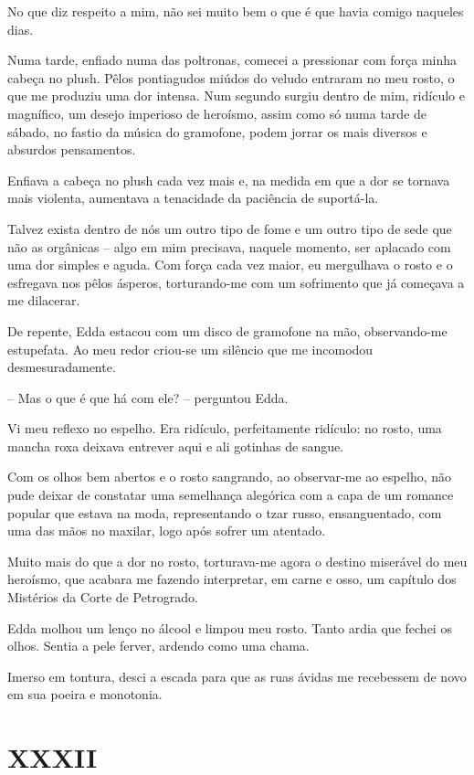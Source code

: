 No que diz respeito a mim, não sei muito bem o que é que havia comigo naqueles dias.

Numa tarde, enfiado numa das poltronas, comecei a pressionar com força minha cabeça no plush. Pêlos pontiagudos miúdos do veludo entraram no meu rosto, o que me produziu uma dor intensa. Num segundo surgiu dentro de mim, ridículo e magnífico, um desejo imperioso de heroísmo, assim como só numa tarde de sábado, no fastio da música do gramofone, podem jorrar os mais diversos e absurdos pensamentos.

Enfiava a cabeça no plush cada vez mais e, na medida em que a dor se tornava mais violenta, aumentava a tenacidade da paciência de suportá-la.

Talvez exista dentro de nós um outro tipo de fome e um outro tipo de sede que não as orgânicas -- algo em mim precisava, naquele momento, ser aplacado com uma dor simples e aguda. Com força cada vez maior, eu mergulhava o rosto e o esfregava nos pêlos ásperos, torturando-me com um sofrimento que já começava a me dilacerar.

De repente, Edda estacou com um disco de gramofone na mão, observando-me estupefata. Ao meu redor criou-se um silêncio que me incomodou desmesuradamente. 

-- Mas o que é que há com ele? -- perguntou Edda. 

Vi meu reflexo no espelho. Era ridículo, perfeitamente ridículo: no rosto, uma mancha roxa deixava entrever aqui e ali gotinhas de sangue.

Com os olhos bem abertos e o rosto sangrando, ao observar-me ao espelho, não pude deixar de constatar uma semelhança alegórica com a capa de um romance popular que estava na moda, representando o tzar russo, ensanguentado, com uma das mãos no maxilar, logo após sofrer um atentado.

Muito mais do que a dor no rosto, torturava-me agora o destino miserável do meu heroísmo, que acabara me fazendo interpretar, em carne e osso, um capítulo dos Mistérios da Corte de Petrogrado. 

Edda molhou um lenço no álcool e limpou meu rosto. Tanto ardia que fechei os olhos. Sentia a pele ferver, ardendo como uma chama.

Imerso em tontura, desci a escada para que as ruas ávidas me recebessem de novo em sua poeira e monotonia.


\chapter*{\centering\Large{XXXII}}

